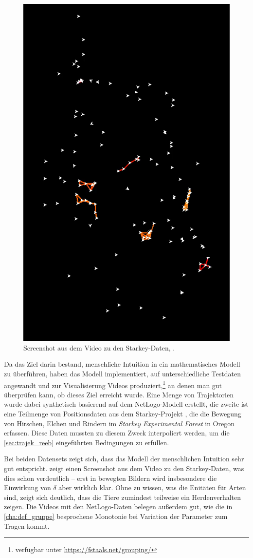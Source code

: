 \begin{figure}
    \Centering\vspace{-\baselineskip}
    \includegraphics[width=.35\textwidth]{Bilder/starkey.png}
    \renewcommand{\figurename}{Abb.}
    \caption{Screenshot aus dem Video zu den Starkey-Daten, \cite{starkey-video}.}\label{fig:starkey}
\end{figure}
Da das Ziel darin bestand, menschliche Intuition in ein mathematisches Modell zu überführen, haben \textcite{buchin2015} das Modell implementiert, auf unterschiedliche Testdaten angewandt und zur Visualisierung Videos produziert,\footnote{verfügbar unter \url{https://fstaals.net/grouping/}} an denen man gut überprüfen kann, ob dieses Ziel erreicht wurde.
Eine Menge von Trajektorien wurde dabei synthetisch basierend auf dem NetLogo-Modell  \cite{netlogo} erstellt, die zweite ist eine Teilmenge von Positionsdaten aus dem Starkey-Projekt \cite{starkey}, die die Bewegung von Hirschen, Elchen und Rindern im \emph{Starkey Experimental Forest} in Oregon erfassen.
Diese Daten mussten zu diesem Zweck interpoliert werden, um die \cref{sec:trajek_reeb} eingeführten Bedingungen zu erfüllen.

Bei beiden Datensets zeigt sich, dass das Modell der menschlichen Intuition sehr gut entspricht.
 zeigt einen Screenshot aus dem Video zu den Starkey-Daten, was dies schon verdeutlich -- erst in bewegten Bildern wird insbesondere die Einwirkung von $\delta$ aber wirklich klar.
Ohne zu wissen, was die Enitäten für Arten sind, zeigt sich deutlich, dass die Tiere zumindest teilweise ein Herdenverhalten zeigen.
Die Videos mit den NetLogo-Daten belegen außerdem gut, wie die in \cref{cha:def_gruppe} besprochene Monotonie bei Variation der Parameter zum Tragen kommt.

